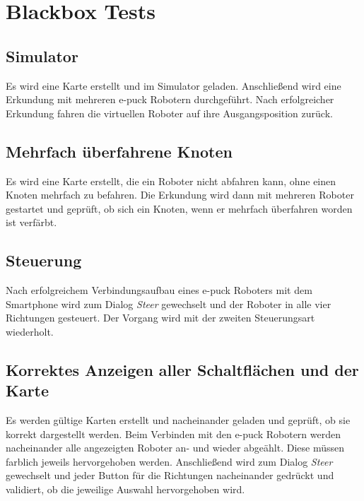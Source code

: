 \documentclass[10pt,a4paper]{article}
\begin{document}
	\section{Blackbox Tests}
		\subsection{Simulator}
			Es wird eine Karte erstellt und im Simulator geladen. Anschlie\ss end wird eine Erkundung mit mehreren e-puck Robotern durchgef\"uhrt. Nach erfolgreicher
			Erkundung fahren die virtuellen Roboter auf ihre Ausgangsposition zur\"uck.
		\subsection{Mehrfach \"uberfahrene Knoten}
			Es wird eine Karte erstellt, die ein Roboter nicht abfahren kann, ohne einen Knoten mehrfach zu befahren. Die Erkundung wird dann mit mehreren Roboter 
 			gestartet und gepr\"uft, ob sich ein Knoten, wenn er mehrfach \"uberfahren worden ist verf\"arbt.
		\subsection{Steuerung}
			Nach erfolgreichem Verbindungsaufbau eines e-puck Roboters mit dem Smartphone wird zum Dialog \textit{Steer} gewechselt und der Roboter in alle vier
			Richtungen gesteuert. Der Vorgang wird mit der zweiten Steuerungsart wiederholt.		
		\subsection{Korrektes Anzeigen aller Schaltfl\"achen und der Karte}
			Es werden g\"ultige Karten erstellt und nacheinander geladen und gepr\"uft, ob sie korrekt dargestellt werden. Beim Verbinden mit den e-puck Robotern werden 
			nacheinander alle angezeigten Roboter an- und wieder abge\"ahlt. Diese m\"ussen farblich jeweils hervorgehoben werden. Anschlie\ss end wird zum Dialog 
			\textit{Steer} gewechselt und jeder Button f\"ur die Richtungen nacheinander gedr\"uckt und validiert, ob die jeweilige Auswahl hervorgehoben wird.
\end{document}
